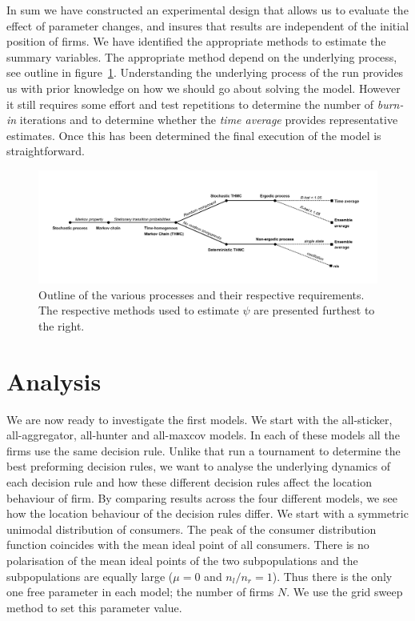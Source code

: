 \documentclass[preprint, 12pt]{elsarticle}
\begin{document}
In sum we have constructed an experimental design that allows us to evaluate the effect of parameter changes, and insures that results are independent of the initial position of firms. We have identified the appropriate methods to estimate the summary variables. The appropriate method depend on the underlying process, see outline in figure~\ref{fig:process}. Understanding the underlying process of the run provides us with prior knowledge on how we should go about solving the model. However it still requires some effort and test repetitions to determine the number of \emph{burn-in} iterations and to determine whether the \emph{time average} provides representative estimates. Once this has been determined the final execution of the model is straightforward.

\begin{figure}[ht]
	\centering
	\includegraphics[width=\textwidth, trim={16mm 15mm 19mm 20mm},clip]{Graphics/Process.pdf}
	\caption{Outline of the various processes and their respective requirements. The respective methods used to estimate $\psi$ are presented furthest to the right.}
	\label{fig:process}
\end{figure}


\section{Analysis}

We are now ready to investigate the first models. We start with the all-sticker, all-aggregator, all-hunter and all-maxcov models. In each of these models all the firms use the same decision rule. Unlike \citet{Fowler_Laver_2008} that run a tournament to determine the best preforming decision rules, we want to analyse the underlying dynamics of each decision rule and how these different decision rules affect the location behaviour of firm. By comparing results across the four different models, we see how the location behaviour of the decision rules differ. We start with a symmetric unimodal distribution of consumers. The peak of the consumer distribution function coincides with the mean ideal point of all consumers. There is no polarisation of the mean ideal points of the two subpopulations and the subpopulations are equally large ($\mu=0$ and $n_l/n_r=1$). Thus there is the only one free parameter in each model; the number of firms $N$. We use the grid sweep method to set this parameter value.
\end{document}
